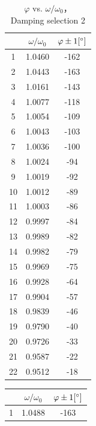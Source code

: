 \begin{figure}
  \centering
\begin{minipage}{0.45\textwidth}
\begin{table}[H]
\centering
\begin{tabular}{|c|c|c|}
\hline
& $\omega/\omega_0$ &  $\varphi \pm 1 [^\circ] $ \\ \hline
1  & 1.0460  & -162  \\ \hline
2  & 1.0443  & -163  \\ \hline
3  & 1.0161  & -143  \\ \hline
4  & 1.0077  & -118  \\ \hline
5  & 1.0054  & -109  \\ \hline
6  & 1.0043  & -103  \\ \hline
7  & 1.0036  & -100  \\ \hline
8  & 1.0024  & -94   \\ \hline
9  & 1.0019  & -92   \\ \hline
10 & 1.0012  & -89   \\ \hline
11 & 1.0003  & -86   \\ \hline
12 & 0.9997  & -84   \\ \hline
13 & 0.9989  & -82   \\ \hline
14 & 0.9982  & -79   \\ \hline
15 & 0.9969  & -75   \\ \hline
16 & 0.9928  & -64   \\ \hline
17 & 0.9904  & -57   \\ \hline
18 & 0.9839  & -46   \\ \hline
19 & 0.9790  & -40   \\ \hline
20 & 0.9726  & -33   \\ \hline
21 & 0.9587  & -22   \\ \hline
22 & 0.9512  & -18   \\ \hline
\end{tabular}    
\caption{$\varphi$ vs. $\omega/\omega_0$，\\ Damping selection
  2}\label{data_phi2} 
\end{table}
\end{minipage}
%
\begin{minipage}{0.45\textwidth}
\begin{table}[H]
\centering
\begin{tabular}{|c|c|c|}
\hline
& $\omega/\omega_0$ &  $\varphi \pm 1 [^\circ] $ \\ \hline
1  & 1.0488   & -163 \\ \hline

\end{tabular}
\end{table}
\end{minipage}
\end{figure}
